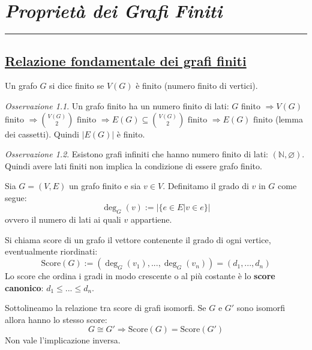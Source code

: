\documentclass[oneside]{book}
\newcommand{\chptr}[1]{\chapter{\textit{#1}}\noindent\rule{\textwidth}{1pt}}
\theoremstyle{remark}
\newtheorem*{osservaz}{Osservazione}
\begin{document}
\chptr{Proprietà dei Grafi Finiti}
\section{\underline{Relazione fondamentale dei grafi finiti}}
\begin{tcolorbox}[colback=yellow!30, colframe=yellow!30!black, title=Grafo finito]
Un grafo $G$ si dice finito se $V(G)$ è finito (numero finito di vertici).
\end{tcolorbox}

\begin{osservaz}
Un grafo finito ha un numero finito di lati:
$G$ finito $\Longrightarrow V(G)$ finito
$\Longrightarrow \binom{V(G)}{2} \text{ finito } \Longrightarrow E(G) \subseteq
\binom{V(G)}{2} \text{ finito } \Longrightarrow E(G) \text{ finito}$ (lemma dei cassetti).
Quindi $|E(G)|$ è finito.
\end{osservaz}

\begin{osservaz}
Esistono grafi infiniti che hanno numero finito di
lati: $(\mathbb{N}, \varnothing)$. Quindi avere lati finiti non implica la
condizione di essere grafo finito.
\end{osservaz}

\begin{tcolorbox}[colback=yellow!30, colframe=yellow!30!black, title=Grado di un vertice]
Sia $G=(V,E)$ un grafo finito e sia $v \in V$. Definitamo il grado di $v$
in $G$ come segue:
\[  \deg_G(v) := |\{e \in E| v \in e\}| \]
ovvero il numero di lati ai quali $v$ appartiene.
\end{tcolorbox}

\begin{tcolorbox}[colback=yellow!30, colframe=yellow!30!black, title=Score di un grafo]
Si chiama score di un grafo il vettore contenente il grado di ogni vertice,
eventualmente riordinati:
\[ \text{Score}(G) := (\deg_G(v_1),...,\deg_G(v_n)) = (d_1,...,d_n) \]
Lo score che ordina i gradi in modo crescente o al più costante è lo \textbf{score canonico}:
$d_1\leq ...\leq d_n$.
\end{tcolorbox}
Sottolineamo la relazione tra score di grafi isomorfi. Se $G$ e $G'$ sono isomorfi allora hanno lo stesso score:
\[ G \cong G' \Longrightarrow \text{Score}(G) = \text{Score}(G') \]
Non vale l'implicazione inversa.
\end{document}
